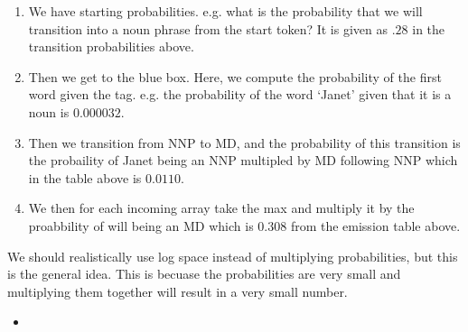 \documentclass[11pt]{article}
\begin{document}
\begin{enumerate}
    \item We have starting probabilities. e.g. what is the probability that we will transition into a noun phrase from the start token? It is given as $.28$ in the transition probabilities above.
    \item Then we get to the blue box. Here, we compute the probability of the first word given the tag. e.g. the probability of the word `Janet' given that it is a noun is $0.000032$.
    \item Then we transition from NNP to MD, and the probability of this transition is the probaility of Janet being an NNP multipled by MD following NNP which in the table above is $0.0110$.
    \item We then for each incoming array take the max and multiply it by the proabbility of will being an MD which is $0.308$ from the emission table above.
\end{enumerate}

We should realistically use log space instead of multiplying probabilities, but this is the general idea. This is becuase the probabilities are very small and multiplying them together will result in a very small number.

\begin{minipage}[l]{.5\linewidth}
    \begin{figure}[H]
        \centering
    \end{figure}    
\end{minipage}\hfill
\begin{minipage}[r]{.48\linewidth}
    \begin{itemize}
        \item
    \end{itemize}
\end{minipage}
\end{document}
